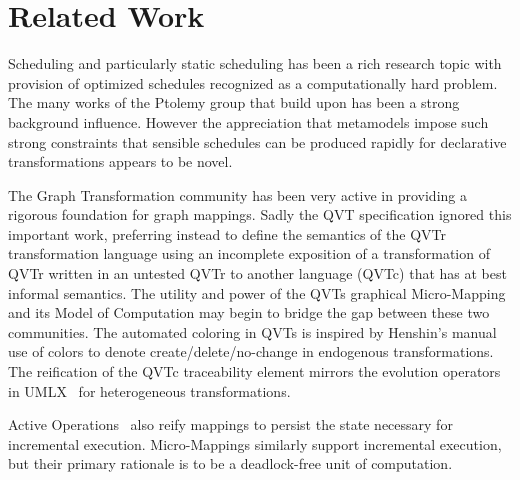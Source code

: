 \documentclass[conference]{IEEEtran}
\begin{document}


\section{Related Work}\label{Related Work}

Scheduling and particularly static scheduling has been a rich research topic with provision of optimized schedules recognized as a computationally hard problem. The many works of the Ptolemy group \cite{dataflow} that build upon \cite{sdf} has been a strong background influence. However the appreciation that metamodels impose such strong constraints that sensible schedules can be produced rapidly for declarative transformations appears to be novel.

The Graph Transformation community has been very active in providing a rigorous foundation for graph mappings. Sadly the QVT specification ignored this important work, preferring instead to define the semantics of the QVTr transformation language using an incomplete exposition of a transformation of QVTr written in an untested QVTr to another language (QVTc) that has at best informal semantics. The utility and power of the QVTs graphical Micro-Mapping and its Model of Computation may begin to bridge the gap between these two communities. The automated coloring in QVTs is inspired by Henshin's \cite{Henshin} manual use of colors to denote create/delete/no-change in endogenous transformations. The reification of the QVTc traceability element mirrors the evolution operators in UMLX~\cite{UMLX} for heterogeneous transformations.

Active Operations~\cite{Jouault-ActiveOperations} also reify mappings 
to persist the state necessary for incremental execution. Micro-Mappings similarly support incremental execution, but their primary rationale is to be a deadlock-free unit of computation.
\end{document}
